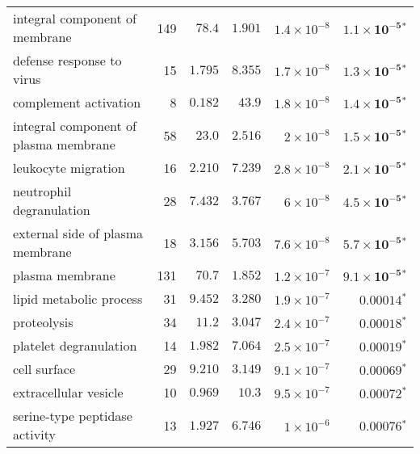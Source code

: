 \documentclass{article}
\begin{document}
\begin{table*}[!ht]
\begin{adjustbox}{width = 1\textwidth}
\begin{tabular}{|l|r|r|r|r|r|}
                integral component of membrane                    & 149 & $  78.4$   & $ 1.901$ & $1.4\times 10^{-8}$  & $\bm{1.1\times 10^{-5}{^*}}$  \\
                defense response to virus                         & 15  & $ 1.795$ & $ 8.355$ & $1.7\times 10^{-8}$  & $\bm{1.3\times 10^{-5}{^*}}$  \\
                complement activation                             & 8   & $ 0.182$ & $  43.9$   & $1.8\times 10^{-8}$  & $\bm{1.4\times 10^{-5}{^*}}$  \\
                integral component of plasma membrane             & 58  & $  23.0$   & $ 2.516$ & $ 2\times 10^{-8}$   & $\bm{1.5\times 10^{-5}{^*}}$  \\
                leukocyte migration                               & 16  & $ 2.210$ & $ 7.239$ & $2.8\times 10^{-8}$  & $\bm{2.1\times 10^{-5}{^*}}$  \\
                neutrophil degranulation                          & 28  & $ 7.432$ & $ 3.767$ & $ 6\times 10^{-8}$   & $\bm{4.5\times 10^{-5}{^*}}$  \\
                external side of plasma membrane                  & 18  & $ 3.156$ & $ 5.703$ & $7.6\times 10^{-8}$  & $\bm{5.7\times 10^{-5}{^*}}$  \\
                plasma membrane                                   & 131 & $  70.7$   & $ 1.852$ & $1.2\times 10^{-7}$  & $\bm{9.1\times 10^{-5}{^*}}$  \\
                lipid metabolic process                           & 31  & $ 9.452$ & $ 3.280$ & $1.9\times 10^{-7}$  & $\bm{0.00014{^*}}$            \\
                proteolysis                                       & 34  & $  11.2$   & $ 3.047$ & $2.4\times 10^{-7}$  & $\bm{0.00018{^*}}$            \\
                platelet degranulation                            & 14  & $ 1.982$ & $ 7.064$ & $2.5\times 10^{-7}$  & $\bm{0.00019{^*}}$            \\
                cell surface                                      & 29  & $ 9.210$ & $ 3.149$ & $9.1\times 10^{-7}$  & $\bm{0.00069{^*}}$            \\
                extracellular vesicle                             & 10  & $ 0.969$ & $  10.3$   & $9.5\times 10^{-7}$  & $\bm{0.00072{^*}}$            \\
                serine-type peptidase activity                    & 13  & $ 1.927$ & $ 6.746$ & $ 1\times 10^{-6}$   & $\bm{0.00076{^*}}$            \\

\end{tabular}
\end{adjustbox}
\end{table*}
\end{document}
